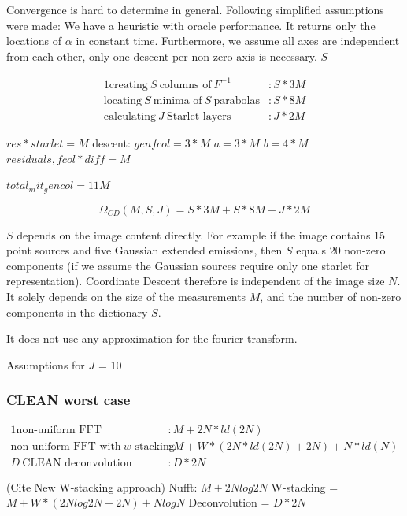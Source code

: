 Convergence is hard to determine in general. Following simplified assumptions were made: We have a heuristic with oracle performance. It returns only the locations of $\alpha$ in constant time. Furthermore, we assume all axes are independent from each other, only one descent per non-zero axis is necessary.
$S$

\begin{alignat*}{1}
	\text{creating} \:S\: \text{columns of}\: F^{-1} &: S*3M\\
	\text{locating} \:S\: \text{minima of} \:S\: \text{parabolas} &: S*8M\\
	\text{calculating} \:J\: \text{Starlet layers} &: J * 2M
\end{alignat*}


$res * starlet = M$
descent:
$gen fcol = 3*M$
$a = 3 * M$
$b = 4 * M$
$residuals, fcol*diff =  M$

$total_mit_gencol = 11M$

\begin{equation}\label{results:cd:omega}
	\Omega_{CD}(M, S, J) = S*3M + S * 8M + J * 2M
\end{equation}

$S$ depends on the image content directly. For example if the image contains 15 point sources and five Gaussian extended emissions, then $S$ equals 20 non-zero components (if we assume the Gaussian sources require only one starlet for representation). Coordinate Descent therefore is independent of the image size $N$. It solely depends on the size of the measurements $M$, and the number of non-zero components in the dictionary $S$. 

It does not use any approximation for the fourier transform.

Assumptions for $J$ = 10

\subsubsection{CLEAN worst case}

\begin{alignat*}{1}
	\text{non-uniform FFT} &: M + 2N*ld(2N)\\
	\text{non-uniform FFT with} \:w\text{-stacking} &:M + W*(2N*ld(2N) + 2N) + N*ld(N)\\
	D\: \text{CLEAN deconvolution} &: D*2N
\end{alignat*}

(Cite New W-stacking approach)
Nufft: $M + 2N log 2N$
W-stacking = $M + W*(2N log 2N + 2N) + N log N$
Deconvolution = $D*2N$


